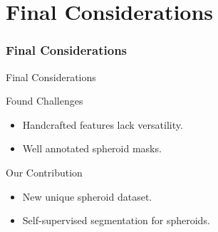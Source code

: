 \section{Final Considerations}


\begin{frame}{}
    \frametitle{Final Considerations}
\end{frame}


\begin{frame}{Final Considerations}
    \begin{block}{Found Challenges}
        \begin{itemize}
            \item Handcrafted features lack versatility.
            \item Well annotated spheroid masks.
        \end{itemize}
    \end{block}
    \begin{block}{Our Contribution}
        \begin{itemize}
            \item New unique spheroid dataset.
            \item Self-supervised segmentation for spheroids.
        \end{itemize}
    \end{block}
\end{frame}
